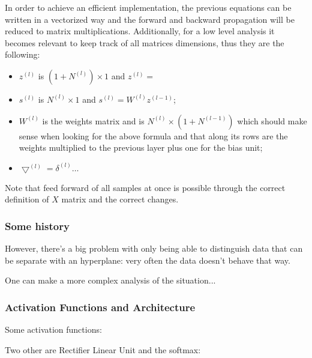 In order to achieve an efficient implementation, the previous equations can be written in a vectorized way and the forward and backward propagation will be reduced to matrix multiplications. Additionally, for a low level analysis it becomes relevant to keep track of all matrices dimensions, thus they are the following:
\begin{itemize}
    \item $z^{(l)}$ is $\left(1 + N^{(l)}\right) \times 1$ and   $z^{(l)} = $ %
    \item $s^{(l)}$ is $N^{(l)} \times 1$ and $s^{(l)} = W^{(l)} z^{(l-1)}$;
    \item $W^{(l)}$ is the weights matrix and is $ N^{(l)} \times \left(1 + N^{(l-1)}\right)$ which should make sense when looking for the above formula and that along its rows are the weights multiplied to the previous layer plus one for the bias unit;
    \item $\bigtriangledown^{(l)} = \delta^{(l)} \dots$
\end{itemize}

Note that feed forward of all samples at once is possible through the correct definition of $X$ matrix and the correct changes.








\subsubsection*{Some history}


However, there's a big problem with only being able to distinguish data that can be separate with an hyperplane: very often the data doesn't behave that way.


One can make a more complex analysis of the situation...



\subsubsection*{Activation Functions and Architecture}

Some activation functions: 


Two other are Rectifier Linear Unit and the softmax:

